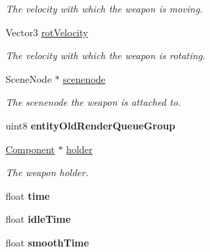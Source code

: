 \begin{DoxyCompactItemize}
\begin{DoxyCompactList}\small\item\em \-The velocity with which the weapon is moving. \end{DoxyCompactList}\item 
\hypertarget{classWeaponInHand_a42987cb82ce4248219cb40837982d54d}{
\-Vector3 \hyperlink{classWeaponInHand_a42987cb82ce4248219cb40837982d54d}{rot\-Velocity}}
\label{dc/d08/classWeaponInHand_a42987cb82ce4248219cb40837982d54d}

\begin{DoxyCompactList}\small\item\em \-The velocity with which the weapon is rotating. \end{DoxyCompactList}\item 
\hypertarget{classWeaponInHand_a73a91f70b2238c6509f958053300e425}{
\-Scene\-Node $\ast$ \hyperlink{classWeaponInHand_a73a91f70b2238c6509f958053300e425}{scenenode}}
\label{dc/d08/classWeaponInHand_a73a91f70b2238c6509f958053300e425}

\begin{DoxyCompactList}\small\item\em \-The scenenode the weapon is attached to. \end{DoxyCompactList}\item 
\hypertarget{classWeaponInHand_ae3a7d28c16ff2947fadc51134daf2db5}{
uint8 {\bfseries entity\-Old\-Render\-Queue\-Group}}
\label{dc/d08/classWeaponInHand_ae3a7d28c16ff2947fadc51134daf2db5}

\item 
\hypertarget{classWeaponInHand_a57c4ee1eadbe84472318dfa13b7b1848}{
\hyperlink{classComponent}{\-Component} $\ast$ \hyperlink{classWeaponInHand_a57c4ee1eadbe84472318dfa13b7b1848}{holder}}
\label{dc/d08/classWeaponInHand_a57c4ee1eadbe84472318dfa13b7b1848}

\begin{DoxyCompactList}\small\item\em \-The weapon holder. \end{DoxyCompactList}\item 
\hypertarget{classWeaponInHand_ab4d2202bb710d21406325264841004e1}{
float {\bfseries time}}
\label{dc/d08/classWeaponInHand_ab4d2202bb710d21406325264841004e1}

\item 
\hypertarget{classWeaponInHand_ace27dc9674016589d766437a2ba5f892}{
float {\bfseries idle\-Time}}
\label{dc/d08/classWeaponInHand_ace27dc9674016589d766437a2ba5f892}

\item 
\hypertarget{classWeaponInHand_a1b8b691049b4142f8aa2b2bab16c3f46}{
float {\bfseries smooth\-Time}}
\label{dc/d08/classWeaponInHand_a1b8b691049b4142f8aa2b2bab16c3f46}

\end{DoxyCompactItemize}

